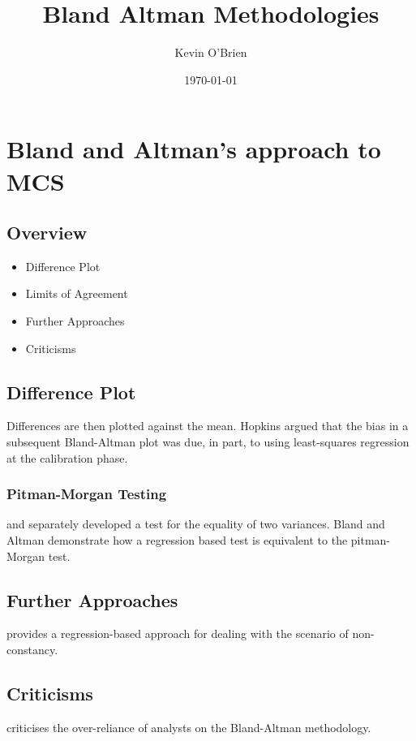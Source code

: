 \documentclass[12pt, a4paper]{report}
\begin{document}
\author{Kevin O'Brien}
\title{Bland Altman Methodologies}
\date{\today}
\maketitle

\tableofcontents \setcounter{tocdepth}{3}

\chapter{Bland and Altman's approach to MCS}
\section*{Overview}
\begin{itemize}
\item Difference Plot
\item Limits of Agreement
\item Further Approaches
\item Criticisms
\end{itemize}
\section{Difference Plot}


Differences are then plotted against the mean.
Hopkins argued that the bias in a subsequent Bland-Altman plot was
due, in part, to using least-squares regression at the calibration
phase.



\subsection{Pitman-Morgan Testing}
\citet{Pitman} and \citet{morgan} separately developed a test for the equality of two variances. Bland and Altman demonstrate how a regression based test is equivalent to the pitman-Morgan test.
\newpage

\section{Further Approaches}
\citet{BA99} provides a regression-based approach for dealing with the scenario of non-constancy.


\section{Criticisms}
\citet{DunnSEME} criticises the over-reliance of analysts on the Bland-Altman methodology.




\end{document}
